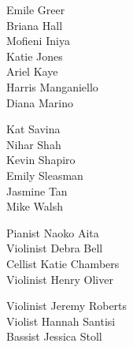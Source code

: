 \documentclass{article}[10pt]
\begin{document}
\begin{center}
\begin{multicols}{3}
\begin{center}
\begin{small}
{Emile Greer}\\
{Briana Hall}\\
{Mofieni Iniya}\\
{Katie Jones}\\
{Ariel Kaye}\\
{Harris Manganiello}\\
{Diana Marino}\null
\columnbreak

{Kat Savina}\\
{Nihar Shah}\\
{Kevin Shapiro}\\
{Emily Sleasman}\\
{Jasmine Tan}\\
{Mike Walsh}
                \end{small}
            \end{center}
        \end{multicols}

        \begin{center}
            \begin{minipage}{3.5in}
                \vspace{-0.1in}
                \begin{multicols}{2}
                    \begin{center}
                        \begin{small}
                            {Pianist Naoko Aita}\\
{Violinist Debra Bell}\\
{Cellist Katie Chambers}\\
{Violinist Henry Oliver}\null
\columnbreak

{Violinist Jeremy Roberts}\\
{Violist Hannah Santisi}\\
{Bassist Jessica Stoll}
                        \end{small}
                    \end{center}
                \end{multicols}
            \end{minipage}
        \end{center}

    \end{center}
    \vfill

    \pagebreak

\end{document}

